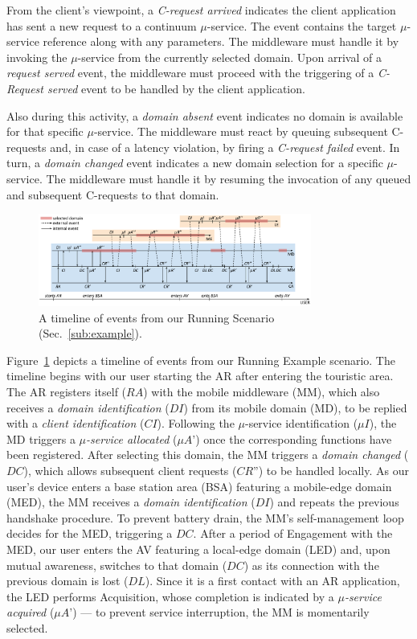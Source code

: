 From the client's viewpoint, a \textit{C-request arrived} indicates the client application has sent a new request to a continuum $\mu$-service. The event contains the target $\mu$-service reference along with any parameters. The middleware must handle it by invoking the $\mu$-service from the currently selected domain. Upon arrival of a \textit{request served} event, the middleware must proceed with the triggering of a \textit{C-Request served} event to be handled by the client application. 

Also during this activity, a \textit{domain absent} event indicates no domain is available for that specific $\mu$-service. The middleware must react by queuing subsequent C-requests and, in case of a latency violation, by firing a \textit{C-request failed} event. In turn, a \textit{domain changed} event indicates a new domain selection for a specific $\mu$-service. The middleware must handle it by resuming the invocation of any queued and subsequent C-requests to that domain.

\begin{figure}[tbp]
	\includegraphics[width=0.8\textwidth]{figs/A3-E-instance-events}
	\caption{A timeline of events from our Running Scenario (Sec.~\ref{sub:example}).}
	\label{fig:A3-E-instance-events}
\end{figure}

Figure~\ref{fig:A3-E-instance-events} depicts a timeline of events from our Running Example scenario. The timeline begins with our user starting the AR after entering the touristic area. The AR registers itself ($RA$) with the mobile middleware (MM), which also receives a \textit{domain identification} ($DI$) from its mobile domain (MD), to be replied with a \textit{client identification} ($CI$). Following the $\mu$-service identification ($\mu I$), the MD triggers a \textit{$\mu$-service allocated} ($\mu A$') once the corresponding functions have been registered. After selecting this domain, the MM triggers a \textit{domain changed} ($DC$), which allows subsequent client requests ($CR$'') to be handled locally. As our user's device enters a base station area (BSA) featuring a mobile-edge domain (MED), the MM receives a \textit{domain identification} ($DI$) and repeats the previous handshake procedure. To prevent battery drain, the MM's self-management loop decides for the MED, triggering a $DC$. After a period of Engagement with the MED, our user enters the AV featuring a local-edge domain (LED) and, upon mutual awareness, switches to that domain ($DC$) as its connection with the previous domain is lost ($DL$). Since it is a first contact with an AR application, the LED performs Acquisition, whose completion is indicated by a \textit{$\mu$-service acquired} ($\mu A$') --- to prevent service interruption, the MM is momentarily selected.


